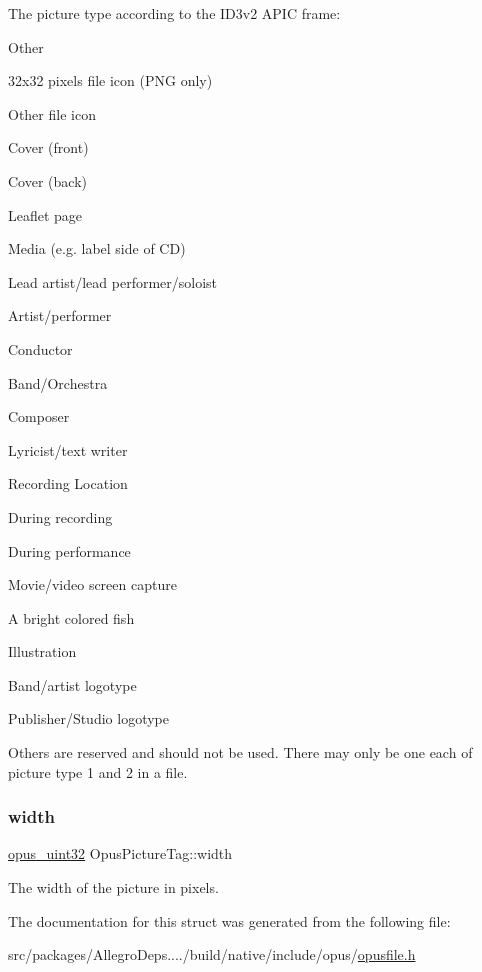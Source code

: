 The picture type according to the I\+D3v2 A\+P\+IC frame\+: 
\begin{DoxyEnumerate}
\item Other 
\item 32x32 pixels \textquotesingle{}file icon\textquotesingle{} (P\+NG only) 
\item Other file icon 
\item Cover (front) 
\item Cover (back) 
\item Leaflet page 
\item Media (e.\+g. label side of CD) 
\item Lead artist/lead performer/soloist 
\item Artist/performer 
\item Conductor 
\item Band/\+Orchestra 
\item Composer 
\item Lyricist/text writer 
\item Recording Location 
\item During recording 
\item During performance 
\item Movie/video screen capture 
\item A bright colored fish 
\item Illustration 
\item Band/artist logotype 
\item Publisher/\+Studio logotype 
\end{DoxyEnumerate}Others are reserved and should not be used. There may only be one each of picture type 1 and 2 in a file. \mbox{\label{struct_opus_picture_tag_a805d4de3372bac983cadbd916350ddd6}} 
\subsubsection{\texorpdfstring{width}{width}}
{\footnotesize\ttfamily \hyperlink{opus__types_8h_a643eaaadb9ef6cd44308e0299d8cd8ce}{opus\+\_\+uint32} Opus\+Picture\+Tag\+::width}

The width of the picture in pixels. 

The documentation for this struct was generated from the following file\+:\begin{DoxyCompactItemize}
\item 
src/packages/\+Allegro\+Deps..../build/native/include/opus/\hyperlink{opusfile_8h}{opusfile.\+h}\end{DoxyCompactItemize}
